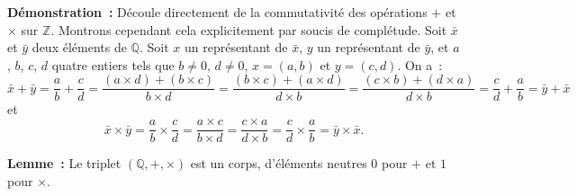\medskip

\noindent\textbf{Démonstration :} Découle directement de la commutativité des opérations $+$ et $\times$ sur $\mathbb{Z}$. 
    Montrons cependant cela explicitement par soucis de complétude. 
    Soit $\bar{x}$ et $\bar{y}$ deux éléments de $\mathbb{Q}$. 
    Soit $x$ un représentant de $\bar{x}$, $y$ un représentant de $\bar{y}$, et $a$, $b$, $c$, $d$ quatre entiers tels que $b \neq 0$, $d \neq 0$, $x = (a, b)$ et $y = (c, d)$.
    On a : 
    \begin{equation*}
        \bar{x} + \bar{y} 
            = \frac{a}{b} + \frac{c}{d} 
            = \frac{(a \times d) + (b \times c)}{b \times d}
            = \frac{(b \times c) + (a \times d)}{d \times b}
            = \frac{(c \times b) + (d \times a)}{d \times b}
            = \frac{c}{d} + \frac{a}{b}
            = \bar{y} + \bar{x}
    \end{equation*}
    et 
    \begin{equation*}
        \bar{x} \times \bar{y} 
            = \frac{a}{b} \times \frac{c}{d} 
            = \frac{a \times c}{b \times d}
            = \frac{c \times a}{d \times b}
            = \frac{c}{d} \times \frac{a}{b}
            = \bar{y} \times \bar{x} .
    \end{equation*}

\done

\medskip

\noindent\textbf{Lemme :} Le triplet $(\mathbb{Q}, +, \times)$ est un corps, d'éléments neutres $0$ pour $+$ et $1$ pour $\times$.

\medskip

